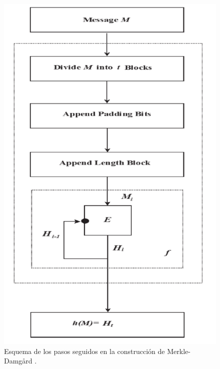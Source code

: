 \begin{figure}[htb]
	\centering
	\includegraphics[scale=0.4]{imagenes/md2.png} 
	\caption{Esquema de los pasos seguidos en la construcción de Merkle-Damgård \cite{Tiwari2017}.}
	\label{mdcon}
\end{figure}
\newpage

